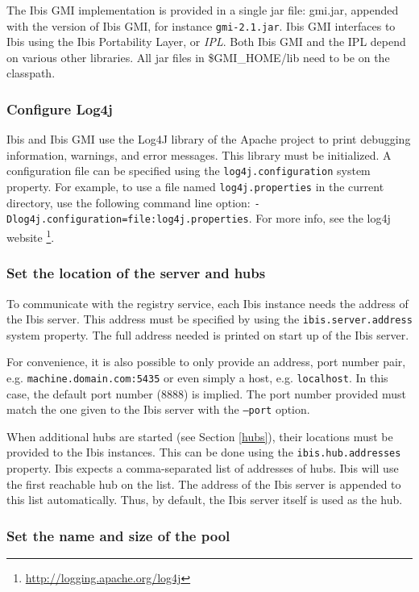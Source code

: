 \documentclass[a4paper,10pt]{article}
\begin{document}
The Ibis GMI implementation is provided in a single jar file: gmi.jar,
appended with the version of Ibis GMI, for instance \texttt{gmi-2.1.jar}.
Ibis GMI interfaces to Ibis using the Ibis Portability Layer, or
\emph{IPL}. Both Ibis GMI and the IPL depend on various other libraries.
All jar files in \$GMI\_HOME/lib need to be on the classpath.

\subsubsection{Configure Log4j}

Ibis and Ibis GMI use the Log4J library of the Apache project to print debugging
information, warnings, and error messages. This library must be
initialized. A configuration file can be specified using the
\texttt{log4j.configuration} system property. For example, to use a file
named \texttt{log4j.properties} in the current directory, use the
following command line option:
\texttt{-Dlog4j.configuration=file:log4j.properties}. For more info,
see the log4j website \footnote{\url{http://logging.apache.org/log4j}}.

\subsubsection{Set the location of the server and hubs}

To communicate with the registry service, each Ibis instance needs the address
of the Ibis server. This address must be specified by using the
\texttt{ibis.server.address} system property. The full address needed is
printed on start up of the Ibis server.

For convenience, it is also possible to only provide an address, port number
pair, e.g. \texttt{machine.domain.com:5435} or even simply a host, e.g.
\texttt{localhost}. In this case, the default port number (8888) is implied.
The port number provided must match the one given to the Ibis server
with the \texttt{--port} option.

When additional hubs are started (see Section \ref{hubs}), their locations
must be provided to the Ibis instances. This can be done using
the \texttt{ibis.hub.addresses} property. Ibis expects a comma-separated
list of addresses of hubs. Ibis will use the first reachable hub on the
list. The address of the Ibis server is appended to this list
automatically. Thus, by default, the Ibis server itself is used as the
hub.

\subsubsection{Set the name and size of the pool}
\end{document}
